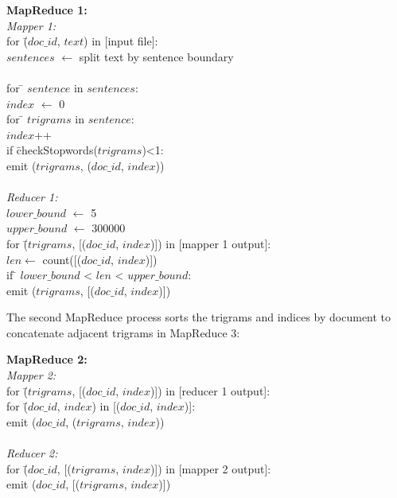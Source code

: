 \documentclass{sig-alternate}
\begin{document}
\begin{centering}

\begin{tabbing}
\textbf{MapReduce 1:}\\
\emph{Mapper 1:}\\

for \= ($doc\_id$, $text$) in [input file]:\\
\>	$sentences$  $\leftarrow$ split text by sentence boundary\\
\\
\>	for \= $sentence$ in $sentences$:\\
\>\>	$index$ $\leftarrow$ 0\\
\>\>	for \= $trigrams$ in $sentence$:\\
\>\>\>		$index$++	\\
\>\>\>		if \= checkStopwords($trigrams$)<1:	\\
\>\>\>\>		emit ($trigrams$, ($doc\_id$, $index$))\\
\\
\emph{Reducer 1:}\\
$lower\_bound$  $\leftarrow$ 5\\
$upper\_bound$  $\leftarrow$ 300000\\
for \= ($trigrams$, [($doc\_id$, $index$)]) in [mapper 1 output]:\\
\>	$len \leftarrow$ count([($doc\_id$, $index$)])\\
\> 	if \= $lower\_bound$ < $len$ < $upper\_bound$:\\
\>\>	emit ($trigrams$, [($doc\_id$, $index$)])\\
\end{tabbing}
\end{centering}

The second MapReduce process sorts the trigrams and indices by document to concatenate adjacent trigrams in MapReduce 3:

\begin{centering}
\begin{tabbing}
\textbf{MapReduce 2:}\\
\emph{Mapper 2:}\\
for \= ($trigrams$, [($doc\_id$, $index$)]) in [reducer 1 output]:\\
\>	for \= ($doc\_id$, $index$) in [($doc\_id$, $index$)]:\\
\>\> emit ($doc\_id$, ($trigrams$, $index$))\\
\\
\emph{Reducer 2:}\\
for \= ($doc\_id$, [($trigrams$, $index$)]) in [mapper 2 output]:\\
\>	emit ($doc\_id$, [($trigrams$, $index$)])

\end{tabbing}

\end{centering}
\end{document}
